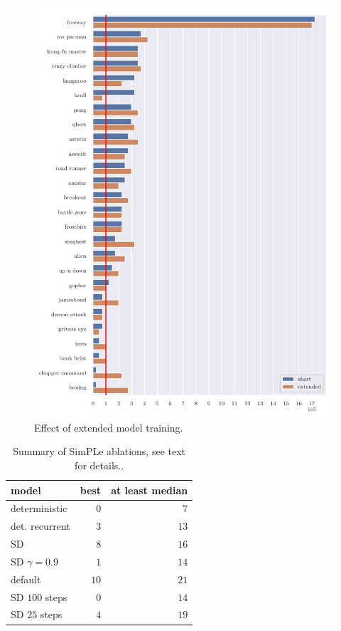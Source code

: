 \begin{figure}
\centering
\includegraphics[width=0.9\columnwidth]{figures/graph_Effect_of_extended_model_training.pdf}
\caption{Effect of extended model training.}
\label{fig:comp_long_train}
\end{figure}





\begin{table}
\caption{Summary of SimPLe ablations, see text for details..}
\begin{center}
  \begin{tabular}{lrr}\label{tab:ab}
model  &  best &  at least median \\
\midrule
deterministic       &     $0$ &                $7$ \\
det. recurrent  &     $3$ &               $13$ \\
SD         &     $8$ &               $16$ \\
SD $\gamma=0.9$     &     $1$ &               $14$ \\
default     &     $10$ &               $21$ \\
SD $100$ steps    &     $0$ &               $14$ \\
SD $25$ steps     &     $4$ &               $19$ \\
\bottomrule
\end{tabular} 
\end{center}
\end{table}

